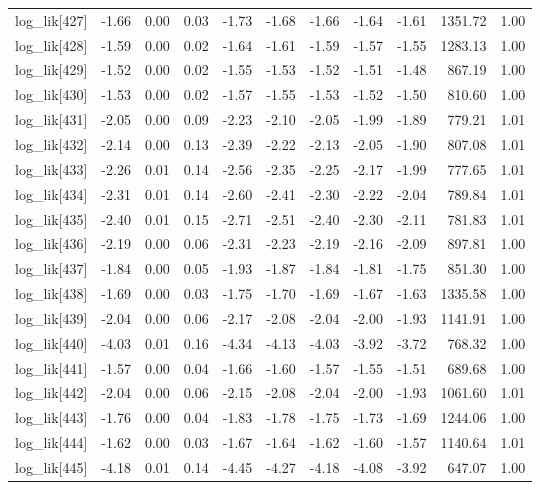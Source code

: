 \begin{table}[ht]
\begin{tabular}{rrrrrrrrrrr}
  log\_lik[427] & -1.66 & 0.00 & 0.03 & -1.73 & -1.68 & -1.66 & -1.64 & -1.61 & 1351.72 & 1.00 \\ 
  log\_lik[428] & -1.59 & 0.00 & 0.02 & -1.64 & -1.61 & -1.59 & -1.57 & -1.55 & 1283.13 & 1.00 \\ 
  log\_lik[429] & -1.52 & 0.00 & 0.02 & -1.55 & -1.53 & -1.52 & -1.51 & -1.48 & 867.19 & 1.00 \\ 
  log\_lik[430] & -1.53 & 0.00 & 0.02 & -1.57 & -1.55 & -1.53 & -1.52 & -1.50 & 810.60 & 1.00 \\ 
  log\_lik[431] & -2.05 & 0.00 & 0.09 & -2.23 & -2.10 & -2.05 & -1.99 & -1.89 & 779.21 & 1.01 \\ 
  log\_lik[432] & -2.14 & 0.00 & 0.13 & -2.39 & -2.22 & -2.13 & -2.05 & -1.90 & 807.08 & 1.01 \\ 
  log\_lik[433] & -2.26 & 0.01 & 0.14 & -2.56 & -2.35 & -2.25 & -2.17 & -1.99 & 777.65 & 1.01 \\ 
  log\_lik[434] & -2.31 & 0.01 & 0.14 & -2.60 & -2.41 & -2.30 & -2.22 & -2.04 & 789.84 & 1.01 \\ 
  log\_lik[435] & -2.40 & 0.01 & 0.15 & -2.71 & -2.51 & -2.40 & -2.30 & -2.11 & 781.83 & 1.01 \\ 
  log\_lik[436] & -2.19 & 0.00 & 0.06 & -2.31 & -2.23 & -2.19 & -2.16 & -2.09 & 897.81 & 1.00 \\ 
  log\_lik[437] & -1.84 & 0.00 & 0.05 & -1.93 & -1.87 & -1.84 & -1.81 & -1.75 & 851.30 & 1.00 \\ 
  log\_lik[438] & -1.69 & 0.00 & 0.03 & -1.75 & -1.70 & -1.69 & -1.67 & -1.63 & 1335.58 & 1.00 \\ 
  log\_lik[439] & -2.04 & 0.00 & 0.06 & -2.17 & -2.08 & -2.04 & -2.00 & -1.93 & 1141.91 & 1.00 \\ 
  log\_lik[440] & -4.03 & 0.01 & 0.16 & -4.34 & -4.13 & -4.03 & -3.92 & -3.72 & 768.32 & 1.00 \\ 
  log\_lik[441] & -1.57 & 0.00 & 0.04 & -1.66 & -1.60 & -1.57 & -1.55 & -1.51 & 689.68 & 1.00 \\ 
  log\_lik[442] & -2.04 & 0.00 & 0.06 & -2.15 & -2.08 & -2.04 & -2.00 & -1.93 & 1061.60 & 1.01 \\ 
  log\_lik[443] & -1.76 & 0.00 & 0.04 & -1.83 & -1.78 & -1.75 & -1.73 & -1.69 & 1244.06 & 1.00 \\ 
  log\_lik[444] & -1.62 & 0.00 & 0.03 & -1.67 & -1.64 & -1.62 & -1.60 & -1.57 & 1140.64 & 1.01 \\ 
  log\_lik[445] & -4.18 & 0.01 & 0.14 & -4.45 & -4.27 & -4.18 & -4.08 & -3.92 & 647.07 & 1.00 \\ 

\end{tabular}
\end{table}
